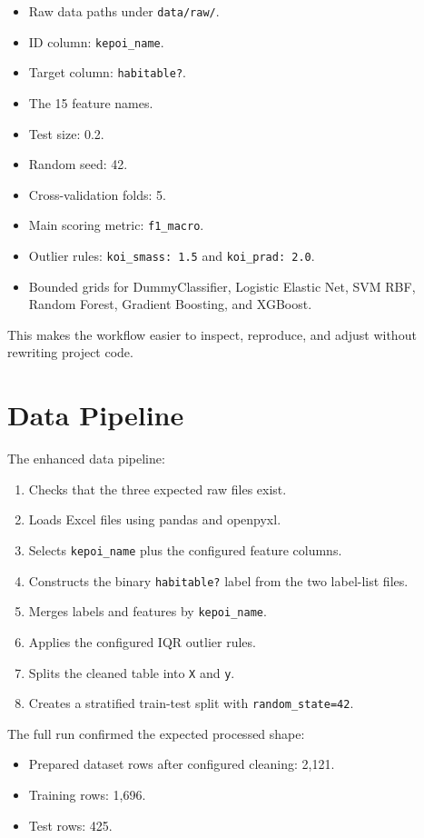 \documentclass[11pt]{article}
\newcommand{\code}[1]{\texttt{#1}}
\begin{document}
\begin{itemize}
  \item Raw data paths under \code{data/raw/}.
  \item ID column: \code{kepoi\_name}.
  \item Target column: \code{habitable?}.
  \item The 15 feature names.
  \item Test size: 0.2.
  \item Random seed: 42.
  \item Cross-validation folds: 5.
  \item Main scoring metric: \code{f1\_macro}.
  \item Outlier rules: \code{koi\_smass: 1.5} and \code{koi\_prad: 2.0}.
  \item Bounded grids for DummyClassifier, Logistic Elastic Net, SVM RBF, Random Forest, Gradient Boosting, and XGBoost.
\end{itemize}

This makes the workflow easier to inspect, reproduce, and adjust without rewriting project code.

\section{Data Pipeline}

The enhanced data pipeline:

\begin{enumerate}
  \item Checks that the three expected raw files exist.
  \item Loads Excel files using pandas and openpyxl.
  \item Selects \code{kepoi\_name} plus the configured feature columns.
  \item Constructs the binary \code{habitable?} label from the two label-list files.
  \item Merges labels and features by \code{kepoi\_name}.
  \item Applies the configured IQR outlier rules.
  \item Splits the cleaned table into \code{X} and \code{y}.
  \item Creates a stratified train-test split with \code{random\_state=42}.
\end{enumerate}

The full run confirmed the expected processed shape:

\begin{itemize}
  \item Prepared dataset rows after configured cleaning: 2,121.
  \item Training rows: 1,696.
  \item Test rows: 425.
\end{itemize}
\end{document}
